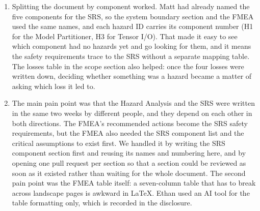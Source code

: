 \documentclass{article}
\begin{document}
\begin{enumerate}
    \item Splitting the document by component worked. Matt had already
    named the five components for the SRS, so the system boundary section
    and the FMEA used the same names, and each hazard ID carries its
    component number (H1 for the Model Partitioner, H3 for Tensor I/O). That made
    it easy to see which component had no hazards yet and go looking for
    them, and it means the safety requirements trace to the SRS without a
    separate mapping table. The losses table in the scope section also
    helped: once the four losses were written down, deciding whether
    something was a hazard became a matter of asking which loss it led to.

    \item The main pain point was that the Hazard Analysis and the SRS were
    written in the same two weeks by different people, and they depend on
    each other in both directions. The FMEA's recommended actions become
    the SRS safety requirements, but the FMEA also needed the SRS component
    list and the critical assumptions to exist first. We handled it by
    writing the SRS component section first and reusing its names and
    numbering here, and by opening one pull request per section so that a
    section could be reviewed as soon as it existed rather than waiting for
    the whole document. The second pain point was the FMEA table itself: a
    seven-column table that has to break across landscape pages is awkward
    in LaTeX. Ethan used an AI tool for the table formatting only, which is
    recorded in the disclosure.


\end{enumerate}
\end{document}
